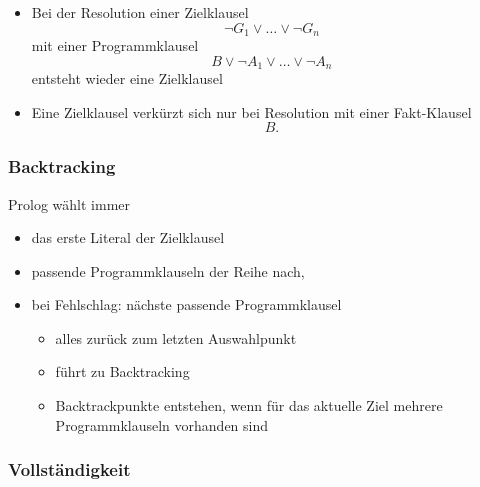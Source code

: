 \documentclass{scrartcl}
\begin{document}
\begin{itemize}
	\item Bei der Resolution einer Zielklausel
	\begin{equation}
		\neg G_1 \vee \ldots \vee \neg G_n
	\end{equation}
	mit einer Programmklausel
	\begin{equation}
		B \vee \neg A_1 \vee \ldots \vee \neg A_n
	\end{equation}
	entsteht wieder eine Zielklausel
	\item Eine Zielklausel verkürzt sich nur bei Resolution mit einer Fakt-Klausel
	\begin{equation}
		B.
	\end{equation}
\end{itemize}

\subsubsection{Backtracking}

Prolog wählt immer
\begin{itemize}
	\item das erste Literal der Zielklausel
	\item passende Programmklauseln der Reihe nach,
	\item bei Fehlschlag: nächste passende Programmklausel
	\begin{itemize}
		\item alles zurück zum letzten Auswahlpunkt
		\item führt zu Backtracking
		\item Backtrackpunkte entstehen, wenn für das aktuelle Ziel mehrere Programmklauseln vorhanden sind
	\end{itemize}
\end{itemize}

\subsubsection{Vollständigkeit}
\end{document}
